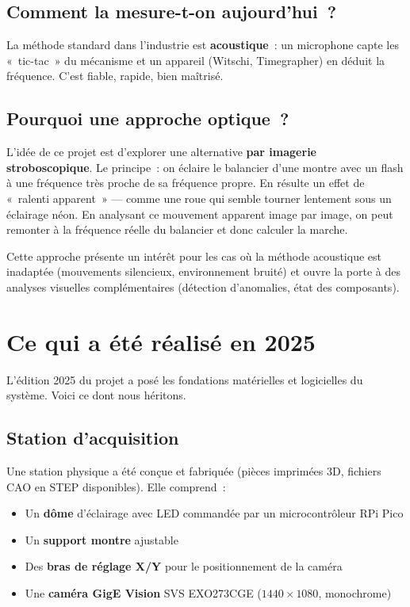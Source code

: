 \documentclass[a4paper,11pt]{article}
\begin{document}
\subsection{Comment la mesure-t-on aujourd'hui~?}

La méthode standard dans l'industrie est \textbf{acoustique}~: un microphone capte les «~tic-tac~» du mécanisme et un appareil (Witschi, Timegrapher) en déduit la fréquence. C'est fiable, rapide, bien maîtrisé.

\subsection{Pourquoi une approche optique~?}

L'idée de ce projet est d'explorer une alternative \textbf{par imagerie stroboscopique}. Le principe~: on éclaire le balancier d'une montre avec un flash à une fréquence très proche de sa fréquence propre. En résulte un effet de «~ralenti apparent~» --- comme une roue qui semble tourner lentement sous un éclairage néon. En analysant ce mouvement apparent image par image, on peut remonter à la fréquence réelle du balancier et donc calculer la marche.

Cette approche présente un intérêt pour les cas où la méthode acoustique est inadaptée (mouvements silencieux, environnement bruité) et ouvre la porte à des analyses visuelles complémentaires (détection d'anomalies, état des composants).

\section{Ce qui a été réalisé en 2025}

L'édition 2025 du projet a posé les fondations matérielles et logicielles du système. Voici ce dont nous héritons.

\subsection{Station d'acquisition}

Une station physique a été conçue et fabriquée (pièces imprimées 3D, fichiers CAO en STEP disponibles). Elle comprend~:

\begin{itemize}
    \item Un \textbf{dôme} d'éclairage avec LED commandée par un microcontrôleur RPi Pico
    \item Un \textbf{support montre} ajustable
    \item Des \textbf{bras de réglage X/Y} pour le positionnement de la caméra
    \item Une \textbf{caméra GigE Vision} SVS EXO273CGE ($1440 \times 1080$, monochrome)
\end{itemize}
\end{document}
